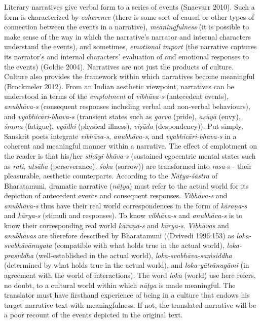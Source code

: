 Literary narratives give verbal form to a series of events (Snaevarr 2010). Such a form is characterized by \textsl{coherence} (there is some sort of causal or other types of connection between the events in a narrative), \textsl{meaningfulness }(it is possible to make sense of the way in which the narrative’s narrator and internal characters understand the events), and sometimes, \textsl{emotional import} (the narrative captures its narrator’s and internal characters’ evaluation of and emotional responses to the events) (Goldie 2004). Narratives are not just the products of culture. Culture also provides the framework within which narratives become meaningful (Brockmeler 2012). From an Indian aesthetic viewpoint, narratives can be understood in terms of the \textsl{emplotment }of \textsl{vibhāva-s} (antecedent events), \textsl{anubhāva-s} (consequent responses including verbal and non-verbal behaviours), and \textsl{vyabhicāri-bhava-s} (transient states such as \textsl{garva }(pride), \textsl{asūyā }(envy), \textsl{śrama }(fatigue), \textsl{vyādhi }(physical illness), \textsl{viṣāda }(despondency)). Put simply, Sanskrit poets integrate \textsl{vibhāva-s}, \textsl{anubhāva-s}, and \textsl{vyabhicāri-bhava-s} in a coherent and meaningful manner within a narrative. The effect of emplotment on the reader is that his/her \textsl{sthāyi-bhāva-s} (sustained egocentric mental states such as \textsl{rati}, \textsl{utsāha }(perseverance), \textsl{śoka }(sorrow)) are transformed into \textsl{rasa}-s - their pleasurable, aesthetic counterparts. According to the \textsl{Nāṭya-śāstra} of Bharatamuni, dramatic narrative (\textsl{nāṭya}) must refer to the actual world for its depiction of antecedent events and consequent responses. \textsl{Vibhāva-s} and \textsl{anubhāva-s} thus have their real world correspondences in the form of \textsl{kāraṇa-s} and \textsl{kārya}\textsl{-s }(stimuli and responses). To know \textsl{vibhāva-s} and \textsl{anubhāva-s} is to know their corresponding real world \textsl{kāraṇa-s} and \textsl{kārya-s}. \textsl{Vibhāvas} and \textsl{anubhāvas} are therefore described by Bharatamuni ((Dvivedi 1996:153) as \textsl{loka-svabhāvānugata} (compatible with what holds true in the actual world), \textsl{loka-prasiddha} (well-established in the actual world), \textsl{loka-svabhāva-saṁsiddha} (determined by what holds true in the actual world), and \textsl{loka-yātrānugāmi} (in agreement with the world of interactions). The word \textsl{loka} (world) use here refers, no doubt, to a cultural world within which \textsl{nāṭya} is made meaningful. The translator must have firsthand experience of being in a culture that endows his target narrative text with meaningfulness. If not, the translated narrative will be a poor recount of the events depicted in the original text. 

